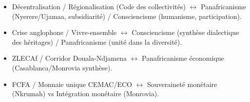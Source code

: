 \documentclass[11pt]{article}
\begin{document}
\begin{methode}
\begin{itemize}
    \item Décentralisation / Régionalisation (Code des collectivités) $\leftrightarrow$ Panafricanisme (Nyerere/Ujamaa, subsidiarité) / Consciencisme (humanisme, participation).
    \item Crise anglophone / Vivre-ensemble $\leftrightarrow$ Consciencisme (synthèse dialectique des héritages) / Panafricanisme (unité dans la diversité).
    \item ZLECAf / Corridor Douala-Ndjamena $\leftrightarrow$ Panafricanisme économique (Casablanca/Monrovia synthèse).
    \item FCFA / Monnaie unique CEMAC/ECO $\leftrightarrow$ Souveraineté monétaire (Nkrumah) vs Intégration monétaire (Monrovia).
\end{itemize}
\end{methode}
\end{document}

